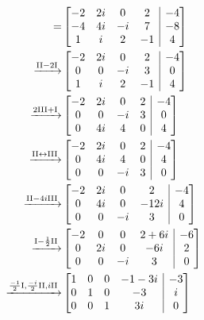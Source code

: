 \documentclass[a4paper, 11pt]{article}
\begin{document}
\begin{align*}
    [A|b] = 
    & \left[ \begin{array}{@{}cccc|c@{}}
        -2 & 2i & 0 & 2 & -4 \\
        -4 & 4i & -i & 7 & -8 \\
        1 & i & 2 & -1 & 4
    \end{array} \right] \\
    \xrightarrow{\text{II} - 2\text{I}}
    & \left[ \begin{array}{@{}cccc|c@{}}
        -2 & 2i & 0 & 2 & -4 \\
        0 & 0 & -i & 3 & 0 \\
        1 & i & 2 & -1 & 4
    \end{array} \right] \\
    \xrightarrow{2\text{III} + \text{I}}
    & \left[ \begin{array}{@{}cccc|c@{}}
        -2 & 2i & 0 & 2 & -4 \\
        0 & 0 & -i & 3 & 0 \\
        0 & 4i & 4 & 0 & 4
    \end{array} \right] \\
    \xrightarrow{\text{II} \leftrightarrow \text{III}}
    & \left[ \begin{array}{@{}cccc|c@{}}
        -2 & 2i & 0 & 2 & -4 \\
        0 & 4i & 4 & 0 & 4 \\
        0 & 0 & -i & 3 & 0
    \end{array} \right] \\
    \xrightarrow{\text{II} - 4i\text{III}}
    & \left[ \begin{array}{@{}cccc|c@{}}
        -2 & 2i & 0 & 2 & -4 \\
        0 & 4i & 0 & -12i & 4 \\
        0 & 0 & -i & 3 & 0
    \end{array} \right] \\
    \xrightarrow{\text{I} - \frac{1}{2}\text{II}}
    & \left[ \begin{array}{@{}cccc|c@{}}
        -2 & 0 & 0 & 2+6i & -6 \\
        0 & 2i & 0 & -6i & 2 \\
        0 & 0 & -i & 3 & 0
    \end{array} \right] \\
    \xrightarrow{\frac{-1}{2}\text{I}, \frac{-i}{2}\text{II}, i\text{II}}
    & \left[ \begin{array}{@{}cccc|c@{}}
        1 & 0 & 0 & -1-3i & -3 \\
        0 & 1 & 0 & -3 & i \\
        0 & 0 & 1 & 3i & 0
    \end{array} \right] \\
\end{align*}
\end{document}
